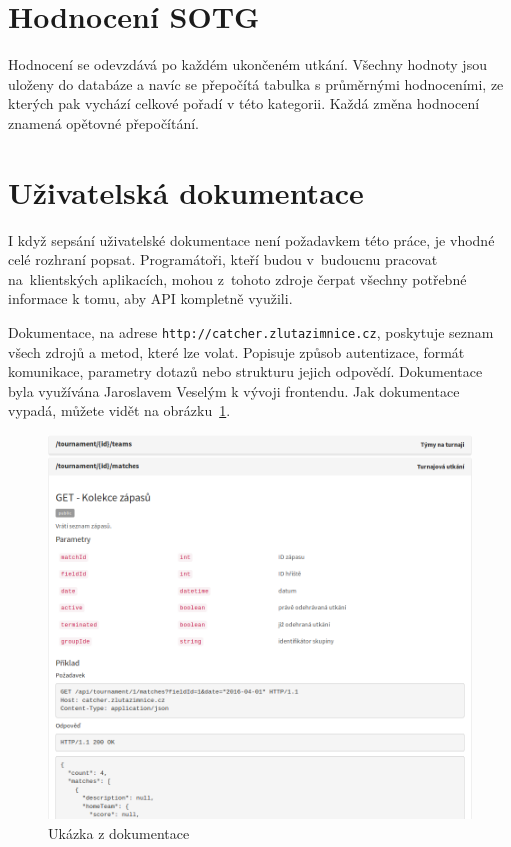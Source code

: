 \section{Hodnocení SOTG}

Hodnocení se odevzdává po každém ukončeném utkání. Všechny hodnoty jsou uloženy do databáze
a navíc se přepočítá tabulka s průměrnými hodnoceními, ze kterých pak vychází celkové pořadí v této kategorii.
Každá změna hodnocení znamená opětovné přepočítání.

\section{Uživatelská dokumentace}


I když sepsání uživatelské dokumentace není požadavkem této práce, je vhodné celé rozhraní popsat.
Programátoři, kteří budou v~budoucnu pracovat na~klientských aplikacích, mohou z~tohoto zdroje čerpat všechny potřebné informace k tomu, aby API kompletně využili.

Dokumentace, na adrese \texttt{http://catcher.zlutazimnice.cz},
poskytuje seznam všech zdrojů a metod, které lze volat. Popisuje způsob autentizace,
formát komunikace, parametry dotazů nebo strukturu jejich odpovědí.
Dokumentace byla využívána Jaroslavem Veselým k vývoji frontendu. Jak dokumentace vypadá, můžete vidět na obrázku~\ref{fig:doc}.

\begin{figure}[ht!]
\centering
\includegraphics[width=130mm]{./images/doc.png}
\caption{Ukázka z dokumentace\label{overflow}}
\label{fig:doc}
\end{figure}
